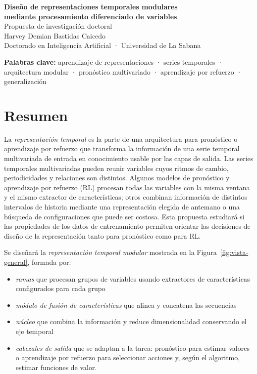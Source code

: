 \documentclass[11pt,letterpaper]{article}
\begin{document}
\begin{center}
{\LARGE\bfseries Diseño de representaciones temporales modulares\\[0.2em]
mediante procesamiento diferenciado de variables}\\[0.8em]
{\large Propuesta de investigación doctoral}\\[0.4em]
Harvey Demian Bastidas Caicedo\\
Doctorado en Inteligencia Artificial · Universidad de La Sabana
\end{center}

\vspace{0.3em}
\noindent\textbf{Palabras clave:}
aprendizaje de representaciones · series temporales · arquitectura modular · pronóstico multivariado · aprendizaje por refuerzo · generalización

\section*{Resumen}

La \emph{representación temporal} es la parte de una arquitectura para pronóstico o aprendizaje por refuerzo que transforma la información de una serie temporal multivariada de entrada en conocimiento usable por las capas de salida. Las series temporales multivariadas pueden reunir variables cuyos ritmos de cambio, periodicidades y relaciones son distintos. Algunos modelos de pronóstico y aprendizaje por refuerzo (RL) procesan todas las variables con la misma ventana y el mismo extractor de características; otros combinan información de distintos intervalos de historia mediante una representación elegida de antemano o una búsqueda de configuraciones que puede ser costosa. Esta propuesta estudiará si las propiedades de los datos de entrenamiento permiten orientar las decisiones de diseño de la representación tanto para pronóstico como para RL.

Se diseñará la \emph{representación temporal modular} mostrada en la Figura~\ref{fig:vista-general}, formada por:
\begin{itemize}
\item \emph{ramas} que procesan grupos de variables usando extractores de características configurados para cada grupo
\item \emph{módulo de fusión de características} que alinea y concatena las secuencias
\item \emph{núcleo} que combina la información y reduce dimensionalidad conservando el eje temporal
\item \emph{cabezales de salida} que se adaptan a la tarea: pronóstico para estimar valores o aprendizaje por refuerzo para seleccionar acciones y, según el algoritmo, estimar funciones de valor.
\end{itemize}
\end{document}
